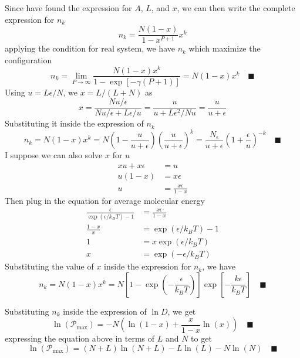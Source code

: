 \documentclass[../../../Main.tex]{subfiles}
\begin{document}
Since have found the expression for $A$, $L$, and $x$, we can then write the complete expression for $n_k$
\begin{equation*}
    n_k=\frac{N(1-x)}{1-x^{P+1}}x^k 
\end{equation*}
applying the condition for real system, we have $n_k$ which maximize the configuration
\begin{equation*}
    n_k=\lim_{P\rightarrow\infty}\frac{N(1-x)x^k}{1-\exp\left[-\gamma (P+1)\right]}=N(1-x)x^k \quad \blacksquare
\end{equation*}
Using $u=L\epsilon/N$, we $x=L/(L+N)$ as 
\begin{equation*}
    x=\frac{Nu/\epsilon}{Nu/\epsilon+L\epsilon/u}=\frac{u}{u+L\epsilon^2/Nu}= \frac{u}{u+\epsilon}
\end{equation*}
Substituting it inside the expression of $n_k$
\begin{equation*}
    n_k=N(1-x)x^k =N\left(1-\frac{u}{u+\epsilon}\right)\left(\frac{u}{u+\epsilon}\right)^k= \frac{N_\epsilon}{u+\epsilon}\left(1+\frac{\epsilon}{u}\right)^{-k} \quad \blacksquare
\end{equation*}
I suppose we can also solve $x$ for $u$
\begin{align*}
    xu+x\epsilon&=u\\
    u(1-x)&=x\epsilon\\
    u&=\frac{x\epsilon}{1-x}
\end{align*}
Then plug in the equation for average molecular energy
\begin{align*}
    \frac{\epsilon}{\exp(\epsilon/k_BT)-1}&=\frac{x\epsilon}{1-x}\\
    \frac{1-x}{x}&=\exp(\epsilon/k_BT)-1\\
    1&=x\exp(\epsilon/k_BT)\\
    x&=\exp(-\epsilon/k_BT)
\end{align*}
Substituting the value of $x$ inside the expression for $n_k$, we have
\begin{equation*}
    n_k=N(1-x)x^k =N\left[1-\exp\left(-\frac{\epsilon}{k_BT}\right)\right]\exp\left[-\frac{k\epsilon}{k_BT}\right]\quad\blacksquare
\end{equation*}

Substituting $n_k$ inside the expression of $\ln D$, we get 
\begin{equation*}
    \ln(\mathcal{P}_\text{max})=-N\left(\ln (1-x)+\frac{x}{1-x}\ln (x)\right)\quad \blacksquare
\end{equation*}
expressing the equation above in terms of $L$ and $N$ to get 
\begin{equation*}
    \ln(\mathcal{P}_\text{max})= (N+L)\ln (N+L) - L\ln (L)-N\ln (N) \quad \blacksquare
\end{equation*}
\end{document}
